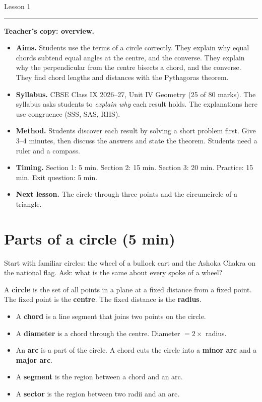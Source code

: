 \hfill{\large Lesson 1}\par\vspace{3pt}
\noindent\rule{\linewidth}{0.6pt}\par\medskip

\colorbox{panel}{%
  \parbox{\dimexpr\linewidth-2\fboxsep\relax}{%
    \small\textbf{Teacher's copy: overview.}
    \begin{itemize}[leftmargin=1.6em,itemsep=1pt,topsep=2pt]
      \item \textbf{Aims.} Students use the terms of a circle correctly. They explain why equal chords subtend equal angles at the centre, and the converse. They explain why the perpendicular from the centre bisects a chord, and the converse. They find chord lengths and distances with the Pythagoras theorem.
      \item \textbf{Syllabus.} CBSE Class IX 2026--27, Unit IV Geometry (25 of 80 marks). The syllabus asks students to \emph{explain why} each result holds. The explanations here use congruence (SSS, SAS, RHS).
      \item \textbf{Method.} Students discover each result by solving a short problem first. Give 3--4 minutes, then discuss the answers and state the theorem. Students need a ruler and a compass.
      \item \textbf{Timing.} Section 1: 5 min. Section 2: 15 min. Section 3: 20 min. Practice: 15 min. Exit question: 5 min.
      \item \textbf{Next lesson.} The circle through three points and the circumcircle of a triangle.
    \end{itemize}}}

\section{Parts of a circle \normalfont\small(5 min)}

Start with familiar circles: the wheel of a bullock cart and the Ashoka Chakra on the national flag. Ask: what is the same about every spoke of a wheel?

\begin{definition}
A \textbf{circle} is the set of all points in a plane at a fixed distance from a fixed point. The fixed point is the \textbf{centre}. The fixed distance is the \textbf{radius}.
\end{definition}

\begin{itemize}[leftmargin=1.8em,itemsep=1pt]
  \item A \textbf{chord} is a line segment that joins two points on the circle.
  \item A \textbf{diameter} is a chord through the centre. Diameter $=2\times$ radius.
  \item An \textbf{arc} is a part of the circle. A chord cuts the circle into a \textbf{minor arc} and a \textbf{major arc}.
  \item A \textbf{segment} is the region between a chord and an arc.
  \item A \textbf{sector} is the region between two radii and an arc.
\end{itemize}

